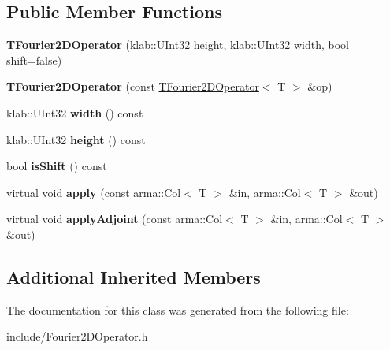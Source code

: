 \subsection*{Public Member Functions}
\begin{DoxyCompactItemize}
\item 
{\bfseries T\+Fourier2\+D\+Operator} (klab\+::\+U\+Int32 height, klab\+::\+U\+Int32 width, bool shift=false)\hypertarget{classkl1p_1_1TFourier2DOperator_a6a73d4b903ddd31eb90230e0dc97e413}{}\label{classkl1p_1_1TFourier2DOperator_a6a73d4b903ddd31eb90230e0dc97e413}

\item 
{\bfseries T\+Fourier2\+D\+Operator} (const \hyperlink{classkl1p_1_1TFourier2DOperator}{T\+Fourier2\+D\+Operator}$<$ T $>$ \&op)\hypertarget{classkl1p_1_1TFourier2DOperator_a9b7a2f6ab9bacef945efcfe01a508d37}{}\label{classkl1p_1_1TFourier2DOperator_a9b7a2f6ab9bacef945efcfe01a508d37}

\item 
klab\+::\+U\+Int32 {\bfseries width} () const \hypertarget{classkl1p_1_1TFourier2DOperator_a4cd8f04a032c960710bc7805df430b48}{}\label{classkl1p_1_1TFourier2DOperator_a4cd8f04a032c960710bc7805df430b48}

\item 
klab\+::\+U\+Int32 {\bfseries height} () const \hypertarget{classkl1p_1_1TFourier2DOperator_a45edca0dbdd0cac051b5e27cf511c91e}{}\label{classkl1p_1_1TFourier2DOperator_a45edca0dbdd0cac051b5e27cf511c91e}

\item 
bool {\bfseries is\+Shift} () const \hypertarget{classkl1p_1_1TFourier2DOperator_a2f38d8c1107c3af9d3b40d6cb3de9723}{}\label{classkl1p_1_1TFourier2DOperator_a2f38d8c1107c3af9d3b40d6cb3de9723}

\item 
virtual void {\bfseries apply} (const arma\+::\+Col$<$ T $>$ \&in, arma\+::\+Col$<$ T $>$ \&out)\hypertarget{classkl1p_1_1TFourier2DOperator_abb5a6de2d0d1b304edc7b624e60faf2b}{}\label{classkl1p_1_1TFourier2DOperator_abb5a6de2d0d1b304edc7b624e60faf2b}

\item 
virtual void {\bfseries apply\+Adjoint} (const arma\+::\+Col$<$ T $>$ \&in, arma\+::\+Col$<$ T $>$ \&out)\hypertarget{classkl1p_1_1TFourier2DOperator_a0e0838aaaf40a283752f7dae9f36f39c}{}\label{classkl1p_1_1TFourier2DOperator_a0e0838aaaf40a283752f7dae9f36f39c}

\end{DoxyCompactItemize}
\subsection*{Additional Inherited Members}


The documentation for this class was generated from the following file\+:\begin{DoxyCompactItemize}
\item 
include/Fourier2\+D\+Operator.\+h\end{DoxyCompactItemize}

